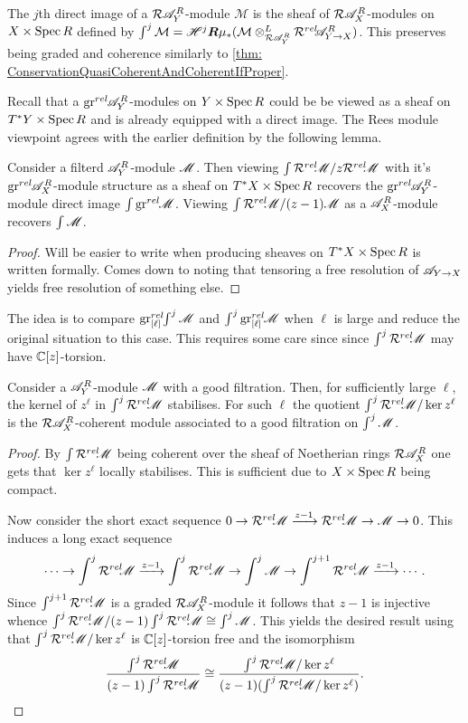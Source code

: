 The $j$th direct image of a $\mathcal{R}\mathscr{A}_Y^R$-module $\mathcal{M}$ is the sheaf of $\mathcal{R}\mathscr{A}_X^R$-modules on $X\times\operatorname{Spec} R$ defined by $\int^j \mathcal{M} = \mathscr{H}^j\boldsymbol{R}\mu_*(\mathcal{M}\otimes^L_{\mathcal{R} \mathscr{A}_Y^R} \mathcal{R}^{rel}\mkern-5mu \mathscr{A}_{Y\to X}^R)$.
This preserves being graded and coherence similarly to \cref{thm: ConservationQuasiCoherentAndCoherentIfProper}. 

Recall that a $\operatorname{gr}^{rel}\mkern-5mu\mathscr{A}_Y^R$-modules on $Y\times \operatorname{Spec} R$ could be be viewed as a sheaf on $T^*Y\times \operatorname{Spec} R$ and is already equipped with a direct image.
The Rees module viewpoint agrees with the earlier definition by the following lemma.
\begin{lemma}\label{lem: ReesAndOtherDirectImagesAgree}
  Consider a filterd $\mathscr{A}_Y^R$-module $\mathscr{M}$. Then viewing $\int \mathcal{R}^{rel}\mkern-5mu\mathscr{M} / z\mathcal{R}^{rel}\mkern-5mu\mathscr{M}$ with it's $\operatorname{gr}^{rel}\mkern-5mu\mathscr{A}_X^R$-module structure as a sheaf on $T^*X\times \operatorname{Spec} R$ recovers the $\operatorname{gr}^{rel}\mkern-5mu\mathscr{A}_Y^R$-module direct image $\int \operatorname{gr}^{rel}\mkern-5mu\mathscr{M}$. Viewing  $\int \mathcal{R}^{rel}\mkern-5mu\mathscr{M} / (z-1)\mathscr{M}$ as a $\mathscr{A}_X^R$-module recovers $\int \mathscr{M}$.
\end{lemma}
\begin{proof}
  Will be easier to write when producing sheaves on $T^*X\times \operatorname{Spec} R$ is written formally. Comes down to noting that tensoring a free resolution of $\mathscr{A}_{Y\to X}$ yields free resolution of something else. 
\end{proof}
The idea is to compare $\operatorname{gr}_{[\ell]}^{rel}\mkern-5mu\int^j\mathscr{M}$ and $\int^j \operatorname{gr}_{[\ell]}^{rel}\mkern-5mu\mathscr{M}$ when $\ell$ is large and reduce the original situation to this case. This requires some care since since $\int^j \mathcal{R}^{rel}\mkern-5mu \mathscr{M}$ may have $\mathbb{C}[z]$-torsion.
\begin{lemma}
  Consider a $\mathscr{A}_Y^R$-module $\mathscr{M}$ with a good filtration. Then, for sufficiently large $\ell$, the kernel of $z^\ell$ in $\int^j \mathcal{R}^{rel}\mkern-5mu \mathscr{M}$ stabilises. For such $\ell$ the quotient $\int^j \mathcal{R}^{rel}\mkern-5mu \mathscr{M}/ \ker z^\ell$ is the $\mathcal{R} \mathscr{A}_X^R$-coherent module associated to a good filtration on $\int^j \mathscr{M}$.
\end{lemma}
\begin{proof}
  By $\int \mathcal{R}^{rel}\mkern-5mu \mathscr{M}$ being coherent over the sheaf of Noetherian rings $\mathcal{R}\mathscr{A}_X^R$ one gets that $\ker z^\ell$ locally stabilises. This is sufficient due to $X\times \operatorname{Spec} R$ being compact.

    Now consider the short exact sequence $0\to \mathcal{R}^{rel}\mkern-5mu \mathscr{M} \xrightarrow{z-1} \mathcal{R}^{rel}\mkern-5mu \mathscr{M} \to \mathscr{M} \to 0$. This induces a long exact sequence
    $$\cdots \to \int^j \mathcal{R}^{rel}\mkern-5mu \mathscr{M} \xrightarrow{z-1} \int^j \mathcal{R}^{rel}\mkern-5mu \mathscr{M} \to \int^j \mathscr{M} \to \int^{j+1} \mathcal{R}^{rel}\mkern-5mu \mathscr{M} \xrightarrow{z-1}\cdots. $$
    Since $\int^{j+1} \mathcal{R}^{rel}\mkern-5mu \mathscr{M}$ is a graded $\mathcal{R}\mathscr{A}_X^R$-module it follows that $z-1$ is injective whence $\int^j \mathcal{R}^{rel}\mkern-5mu \mathscr{M} / (z-1)\int^j \mathcal{R}^{rel}\mkern-5mu \mathscr{M} \cong \int^j \mathscr{M}$. This yields the desired result using that $\int^j \mathcal{R}^{rel}\mkern-5mu \mathscr{M} / \ker z^\ell$ is $\mathbb{C}[z]$-torsion free and the isomorphism
    $$ \frac{\int^j \mathcal{R}^{rel}\mkern-5mu \mathscr{M} }{(z-1)\int^j \mathcal{R}^{rel}\mkern-5mu \mathscr{M} } \cong \frac{\int^j \mathcal{R}^{rel}\mkern-5mu \mathscr{M} /\ker z^\ell }{(z-1)(\int^j \mathcal{R}^{rel}\mkern-5mu \mathscr{M}/\ker z^\ell) }.$$
\end{proof}

